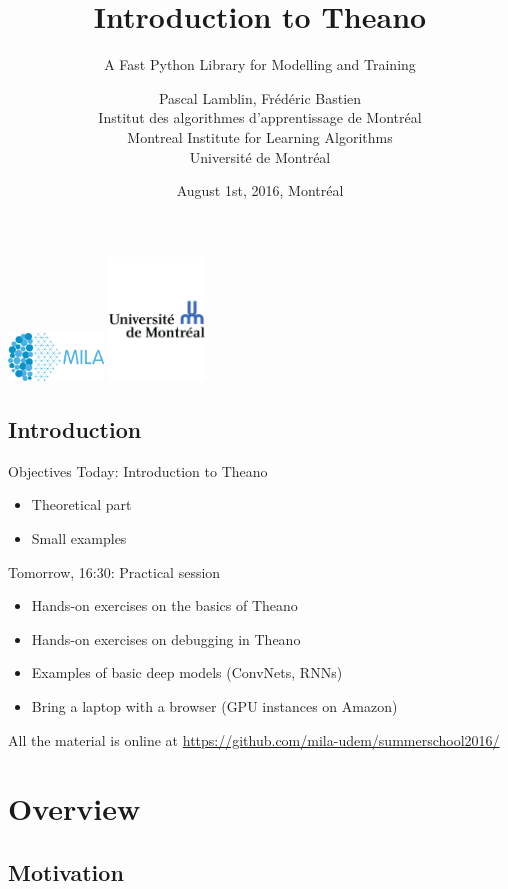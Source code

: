 \documentclass[a4paper,9pt]{beamer}
\title[Intro to Theano]{Introduction to Theano}
\subtitle{A Fast Python Library for Modelling and Training}
\author[MILA]{%
Pascal Lamblin, Frédéric Bastien \\
Institut des algorithmes d'apprentissage de Montréal\\
Montreal Institute for Learning Algorithms\\
Université de Montréal}
\date{%
August 1st, 2016, Montréal
}
\begin{document}
\begin{frame}[plain]
  \titlepage
  \includegraphics[width=1in]{MILA_official_2016.png}
  \hfill
  \includegraphics[width=1in]{UdeM_logo.pdf}
\end{frame}


\subsection*{Introduction}

\begin{frame}{Objectives}
  Today: Introduction to Theano
  \begin{itemize}
    \item Theoretical part
    \item Small examples
  \end{itemize}

  Tomorrow, 16:30: Practical session
  \begin{itemize}
    \item Hands-on exercises on the basics of Theano
    \item Hands-on exercises on debugging in Theano
    \item Examples of basic deep models (ConvNets, RNNs)
    \item Bring a laptop with a browser (GPU instances on Amazon)
  \end{itemize}

  All the material is online at
  \url{https://github.com/mila-udem/summerschool2016/}
\end{frame}


\section{Overview}
\begin{frame}
  \tableofcontents[currentsection]
\end{frame}


\subsection{Motivation}
\end{document}
